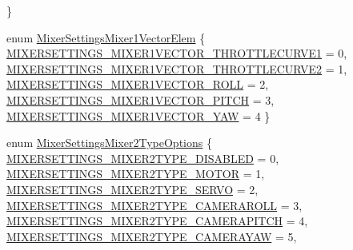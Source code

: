 \begin{DoxyCompactItemize}
 \}
\item 
enum \hyperlink{group___mixer_settings_ga3634f2d8a4a5fb0749eccbcb3a32e91c}{\-Mixer\-Settings\-Mixer1\-Vector\-Elem} \{ \*
\hyperlink{group___mixer_settings_gga3634f2d8a4a5fb0749eccbcb3a32e91caf104383c9eec797871e5e0d2ec4b4b68}{\-M\-I\-X\-E\-R\-S\-E\-T\-T\-I\-N\-G\-S\-\_\-\-M\-I\-X\-E\-R1\-V\-E\-C\-T\-O\-R\-\_\-\-T\-H\-R\-O\-T\-T\-L\-E\-C\-U\-R\-V\-E1} = 0, 
\hyperlink{group___mixer_settings_gga3634f2d8a4a5fb0749eccbcb3a32e91cafd880272618bd3e5fe86b309c3d53ab2}{\-M\-I\-X\-E\-R\-S\-E\-T\-T\-I\-N\-G\-S\-\_\-\-M\-I\-X\-E\-R1\-V\-E\-C\-T\-O\-R\-\_\-\-T\-H\-R\-O\-T\-T\-L\-E\-C\-U\-R\-V\-E2} = 1, 
\hyperlink{group___mixer_settings_gga3634f2d8a4a5fb0749eccbcb3a32e91cad0fef536fe3d6874ea3e0abc983e347d}{\-M\-I\-X\-E\-R\-S\-E\-T\-T\-I\-N\-G\-S\-\_\-\-M\-I\-X\-E\-R1\-V\-E\-C\-T\-O\-R\-\_\-\-R\-O\-L\-L} = 2, 
\hyperlink{group___mixer_settings_gga3634f2d8a4a5fb0749eccbcb3a32e91ca02a1e32e41b0438a3f68b10087985cfa}{\-M\-I\-X\-E\-R\-S\-E\-T\-T\-I\-N\-G\-S\-\_\-\-M\-I\-X\-E\-R1\-V\-E\-C\-T\-O\-R\-\_\-\-P\-I\-T\-C\-H} = 3, 
\*
\hyperlink{group___mixer_settings_gga3634f2d8a4a5fb0749eccbcb3a32e91ca0f2e8fcb559935270ca591e32ec0f9aa}{\-M\-I\-X\-E\-R\-S\-E\-T\-T\-I\-N\-G\-S\-\_\-\-M\-I\-X\-E\-R1\-V\-E\-C\-T\-O\-R\-\_\-\-Y\-A\-W} = 4
 \}
\item 
enum \hyperlink{group___mixer_settings_gacaa54b3ce092ec3dd0803d07b2dd350f}{\-Mixer\-Settings\-Mixer2\-Type\-Options} \{ \*
\hyperlink{group___mixer_settings_ggacaa54b3ce092ec3dd0803d07b2dd350fafbf477c785884c58cf8694a161282478}{\-M\-I\-X\-E\-R\-S\-E\-T\-T\-I\-N\-G\-S\-\_\-\-M\-I\-X\-E\-R2\-T\-Y\-P\-E\-\_\-\-D\-I\-S\-A\-B\-L\-E\-D} = 0, 
\hyperlink{group___mixer_settings_ggacaa54b3ce092ec3dd0803d07b2dd350fa897f4cd445ea1b34f3d9ff842229e7cd}{\-M\-I\-X\-E\-R\-S\-E\-T\-T\-I\-N\-G\-S\-\_\-\-M\-I\-X\-E\-R2\-T\-Y\-P\-E\-\_\-\-M\-O\-T\-O\-R} = 1, 
\hyperlink{group___mixer_settings_ggacaa54b3ce092ec3dd0803d07b2dd350fa43a97775eb1b6bad85a7335d5028e2ee}{\-M\-I\-X\-E\-R\-S\-E\-T\-T\-I\-N\-G\-S\-\_\-\-M\-I\-X\-E\-R2\-T\-Y\-P\-E\-\_\-\-S\-E\-R\-V\-O} = 2, 
\hyperlink{group___mixer_settings_ggacaa54b3ce092ec3dd0803d07b2dd350fad2b68f938ac7ce745a5663f3d0309d65}{\-M\-I\-X\-E\-R\-S\-E\-T\-T\-I\-N\-G\-S\-\_\-\-M\-I\-X\-E\-R2\-T\-Y\-P\-E\-\_\-\-C\-A\-M\-E\-R\-A\-R\-O\-L\-L} = 3, 
\*
\hyperlink{group___mixer_settings_ggacaa54b3ce092ec3dd0803d07b2dd350faf2521700b90aca5b58c1cdc62c3c495f}{\-M\-I\-X\-E\-R\-S\-E\-T\-T\-I\-N\-G\-S\-\_\-\-M\-I\-X\-E\-R2\-T\-Y\-P\-E\-\_\-\-C\-A\-M\-E\-R\-A\-P\-I\-T\-C\-H} = 4, 
\hyperlink{group___mixer_settings_ggacaa54b3ce092ec3dd0803d07b2dd350faa7968f012260f59fca81d554e072343e}{\-M\-I\-X\-E\-R\-S\-E\-T\-T\-I\-N\-G\-S\-\_\-\-M\-I\-X\-E\-R2\-T\-Y\-P\-E\-\_\-\-C\-A\-M\-E\-R\-A\-Y\-A\-W} = 5, 

\end{DoxyCompactItemize}
